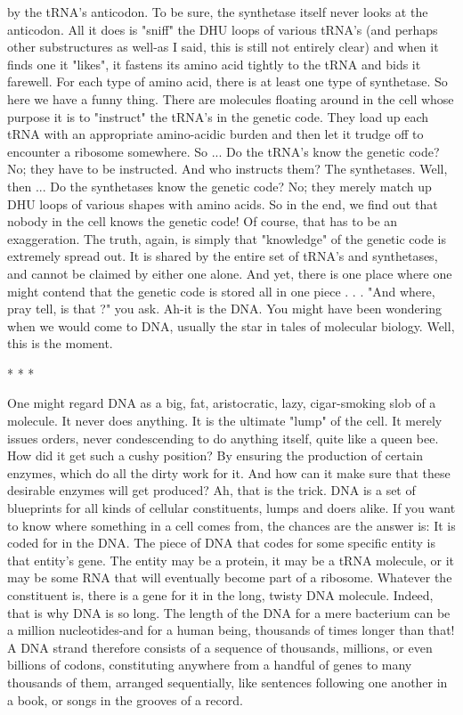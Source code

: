 by the tRNA's anticodon. To be sure, the synthetase itself never looks at the
anticodon. All it does is "sniff" the DHU loops of various tRNA's (and perhaps other
substructures as well-as I said, this is still not entirely clear) and when it finds one it
"likes", it fastens its amino acid tightly to the tRNA and bids it farewell. For each type
of amino acid, there is at least one type of synthetase.
        So here we have a funny thing. There are molecules floating around in the cell
whose purpose it is to "instruct" the tRNA's in the genetic code. They load up each
tRNA with an appropriate amino-acidic burden and then let it trudge off to encounter
a ribosome somewhere. So ... Do the tRNA's know the genetic code? No; they have to
be instructed. And who instructs them? The synthetases. Well, then ... Do the
synthetases know the genetic code? No; they merely match up DHU loops of various
shapes with amino acids. So in the end, we find out that nobody in the cell knows the
genetic code!
        Of course, that has to be an exaggeration. The truth, again, is simply that
"knowledge" of the genetic code is extremely spread out. It is shared by the entire set
of tRNA's and synthetases, and cannot be claimed by either one alone. And yet, there
is one place where one might contend that the genetic code is stored all in one piece . .
. "And where, pray tell, is that ?" you ask. Ah-it is the DNA. You might have been
wondering when we would come to DNA, usually the star in tales of molecular
biology. Well, this is the moment.

                                        *   *   *

        One might regard DNA as a big, fat, aristocratic, lazy, cigar-smoking slob of a
molecule. It never does anything. It is the ultimate "lump" of the cell. It merely issues
orders, never condescending to do anything itself, quite like a queen bee. How did it
get such a cushy position? By ensuring the production of certain enzymes, which do
all the dirty work for it. And how can it make sure that these desirable enzymes will
get produced? Ah, that is the trick.
        DNA is a set of blueprints for all kinds of cellular constituents, lumps and
doers alike. If you want to know where something in a cell comes from, the chances
are the answer is: It is coded for in the DNA. The piece of DNA that codes for some
specific entity is that entity's gene. The entity may be a protein, it may be a tRNA
molecule, or it may be some RNA that will eventually become part of a ribosome.
Whatever the constituent is, there is a gene for it in the long, twisty DNA molecule.
Indeed, that is why DNA is so long. The length of the DNA for a mere bacterium can
be a million nucleotides-and for a human being, thousands of times longer than that!
A DNA strand therefore consists of a sequence of thousands, millions, or even
billions of codons, constituting anywhere from a handful of genes to many thousands
of them, arranged sequentially, like sentences following one another in a book, or
songs in the grooves of a record.




